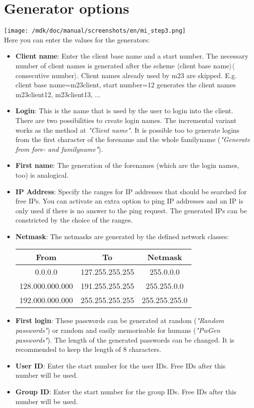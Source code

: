 \section{Generator options}
\texttt{[image: /mdk/doc/manual/screenshots/en/mi\_step3.png]} \\
Here you can enter the values for the generators:\\
\begin{itemize}
\item \textbf{Client name}: Enter the client base name and a start number. The necessary number of client names is generated after the scheme $\langle$client base name$\rangle$$\langle$consecutive number$\rangle$. Client names already used by m23 are skipped. E.g. client base name=m23client, start number=12 generates the client names m23client12, m23client13, ...\\
\item \textbf{Login}: This is the name that is used by the user to login into the client. There are two possibilities to create login names. The incremental variant works as the method at \textit{"Client name"}. It is possible too to generate logins from the first character of the forename and the whole familyname (\textit{"Generate from fore- and familyname"}).\\
\item \textbf{First name}: The generation of the forenames (which are the login names, too) is analogical.\\
\item \textbf{IP Address}: Specify the ranges for IP addresses that should be searched for free IPs. You can activate an extra option to ping IP addresses and an IP is only used if there is no answer to the ping request. The generated IPs can be constricted by the choice of the ranges.\\
\item \textbf{Netmask}: The netmasks are generated by the defined network classes:\\
\begin{tabular}{|c|c|c|}
\hline
From & To & Netmask\\
	 \hline
0.0.0.0 & 127.255.255.255 & 255.0.0.0\\
	 \hline
128.000.000.000 & 191.255.255.255 & 255.255.0.0\\
	 \hline
192.000.000.000 & 255.255.255.255 & 255.255.255.0\\
	 \hline
\end{tabular}
\item \textbf{First login}: These passwords can be generated at random (\textit{"Random passwords"}) or random and easily memorisable for humans (\textit{"PwGen passwords"}). The length of the generated passwords can be changed. It is recommended to keep the length of 8 characters.\\
\item \textbf{User ID}: Enter the start number for the user IDs. Free IDs after this number will be used.\\
\item \textbf{Group ID}: Enter the start number for the group IDs. Free IDs after this number will be used.\\
\end{itemize}
